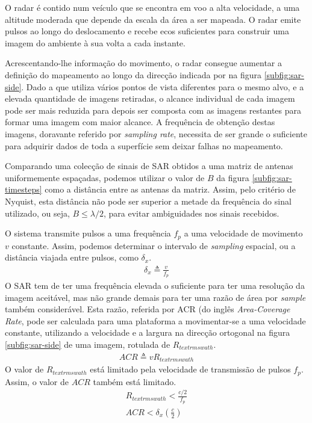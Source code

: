 \documentclass[purist,portuguese]{ist-report}
\begin{document}
O radar é contido num veículo que se encontra em voo a alta velocidade, a uma altitude moderada que depende da escala da área a ser mapeada. O radar emite pulsos ao longo do deslocamento e recebe ecos suficientes para construir uma imagem do ambiente à sua volta a cada instante.

Acrescentando-lhe informação do movimento, o radar consegue aumentar a definição do mapeamento ao longo da direcção indicada por  na figura \ref{subfig:sar-side}. Dado a que utiliza vários pontos de vista diferentes para o mesmo alvo, e a elevada quantidade de imagens retiradas, o alcance individual de cada imagem pode ser mais reduzida para depois ser composta com as imagens restantes para formar uma imagem com maior alcance. A frequência de obtenção destas imagens, doravante referido por \textit{sampling rate}, necessita de ser grande o suficiente para adquirir dados de toda a superfície sem deixar falhas no mapeamento.

Comparando uma colecção de sinais de SAR obtidos a uma matriz de antenas uniformemente espaçadas, podemos utilizar o valor de $B$ da figura \ref{subfig:sar-timesteps} como a distância entre as antenas da matriz. Assim, pelo critério de Nyquist, esta distância não pode ser superior a metade da frequência do sinal utilizado, ou seja, $B \leq \lambda/ 2$, para evitar ambiguidades nos sinais recebidos.

O sistema transmite pulsos a uma frequência $f_p$ a uma velocidade de movimento $v$ constante. Assim, podemos determinar o intervalo de \textit{sampling} espacial, ou a distância viajada entre pulsos, como $\delta_x$.
\begin{gather*}
	\delta_x \triangleq \frac{v}{f_p}
\end{gather*}
O SAR tem de ter uma frequência elevada o suficiente para ter uma resolução da imagem aceitável, mas não grande demais para ter uma razão de área por \textit{sample} também considerável. Esta razão, referida por ACR (do inglês \textit{Area-Coverage Rate}, pode ser calculada para uma plataforma a movimentar-se a uma velocidade constante, utilizando a velocidade e a largura na direcção ortogonal  na figura \ref{subfig:sar-side} de uma imagem, rotulada de $R_{textrm{swath}}$.
\begin{gather*}
	ACR \triangleq vR_{textrm{swath}}
\end{gather*}
O valor de $R_{textrm{swath}}$ está limitado pela velocidade de transmissão de pulsos $f_p$. Assim, o valor de $ACR$ também está limitado.
\begin{gather*}
	R_{textrm{swath}} < \frac{c/2}{f_p} \\
	ACR < \delta_x\left(\frac{c}{2}\right)
\end{gather*}
\end{document}
